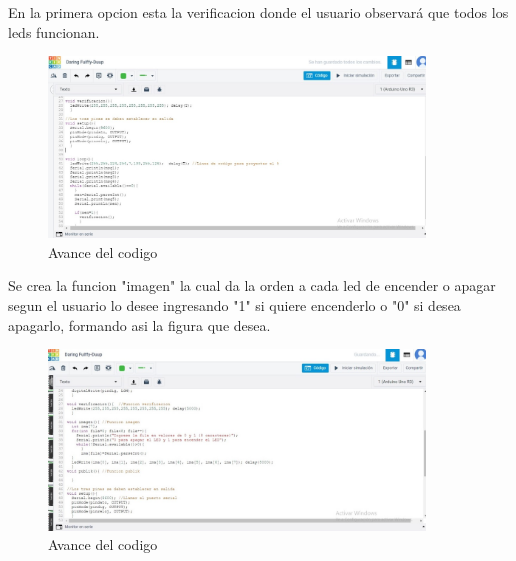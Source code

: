 \documentclass{article}
\begin{document}
En la primera opcion esta la verificacion donde el usuario observará que todos los leds funcionan.
\newpage
\begin{figure}[h]
\includegraphics[width=10cm]{Avance 2.jpeg}
\centering
\caption{Avance del codigo}
\label{fig:Avance 2}
\end{figure}

Se crea la funcion "imagen" la cual da la orden a cada led de encender o apagar segun el usuario lo desee ingresando "1" si quiere encenderlo o "0" si desea apagarlo, formando asi la figura que desea.

\begin{figure}[h]
\includegraphics[width=10cm]{Imagen.jpeg}
\centering
\caption{Avance del codigo}
\label{fig:Imagen}
\end{figure}
\end{document}
